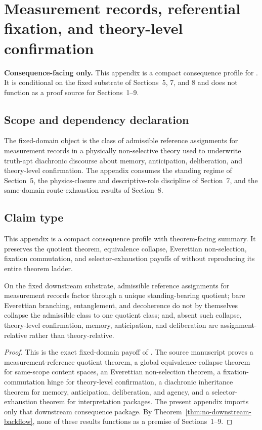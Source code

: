 \section{Measurement records, referential fixation, and theory-level confirmation}
\label{app:measurement-reference}

\begin{fixedbox}
\textbf{Consequence-facing only.} This appendix is a compact consequence profile for \measurementdoc{}. It is conditional on the fixed substrate of Sections~5, 7, and 8 and does not function as a proof source for Sections~1--9.
\end{fixedbox}

\subsection*{Scope and dependency declaration}
The fixed-domain object is the class of admissible reference assignments for measurement records in a physically non-selective theory used to underwrite truth-apt diachronic discourse about memory, anticipation, deliberation, and theory-level confirmation. The appendix consumes the standing regime of Section~5, the physics-closure and descriptive-role discipline of Section~7, and the same-domain route-exhaustion results of Section~8.

\subsection*{Claim type}
This appendix is a compact consequence profile with theorem-facing summary. It preserves the quotient theorem, equivalence collapse, Everettian non-selection, fixation commutation, and selector-exhaustion payoffs of \measurementdoc{} without reproducing its entire theorem ladder.

\begin{proposition}
On the fixed downstream substrate, admissible reference assignments for measurement records factor through a unique standing-bearing quotient; bare Everettian branching, entanglement, and decoherence do not by themselves collapse the admissible class to one quotient class; and, absent such collapse, theory-level confirmation, memory, anticipation, and deliberation are assignment-relative rather than theory-relative.
\end{proposition}

\begin{proof}
This is the exact fixed-domain payoff of \measurementdoc{}. The source manuscript proves a measurement-reference quotient theorem, a global equivalence-collapse theorem for same-scope content spaces, an Everettian non-selection theorem, a fixation-commutation hinge for theory-level confirmation, a diachronic inheritance theorem for memory, anticipation, deliberation, and agency, and a selector-exhaustion theorem for interpretation packages. The present appendix imports only that downstream consequence package. By Theorem~\ref{thm:no-downstream-backflow}, none of these results functions as a premise of Sections~1--9.\cite{MaleyMeasurement}
\end{proof}


